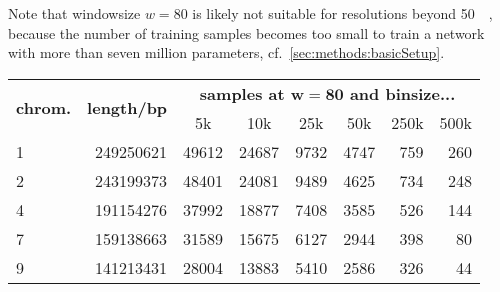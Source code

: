 Note that windowsize $w=80$ is likely not suitable for resolutions beyond \SI{50}{\kilo\bp}, because the number of training samples becomes too small
to train a network with more than seven million parameters, cf.~\cref{sec:methods:basicSetup}.
\begin{table}[hbp]
\centering
\begin{tabular}{lrrrrrrr}
\hline
\multicolumn{1}{c}{\multirow{2}{*}{\textbf{chrom.}}} & \multicolumn{1}{c}{\multirow{2}{*}{\textbf{length/bp}}} & \multicolumn{6}{c}{\textbf{samples at $\mathbf{w=80}$ and binsize...}}                                                                                                \\
\multicolumn{1}{c}{}                                     & \multicolumn{1}{c}{}                                    & \multicolumn{1}{c}{5k} & \multicolumn{1}{c}{10k} & \multicolumn{1}{c}{25k} & \multicolumn{1}{c}{50k} & \multicolumn{1}{c}{250k} & \multicolumn{1}{c}{500k} \\ \hline
1                                                        & 249250621                                               & 49612                  & 24687                   & 9732                    & 4747                    & 759                      & 260                      \\
2                                                        & 243199373                                               & 48401                  & 24081                   & 9489                    & 4625                    & 734                      & 248                      \\
4                                                        & 191154276                                               & 37992                  & 18877                   & 7408                    & 3585                    & 526                      & 144                      \\
7                                                        & 159138663                                               & 31589                  & 15675                   & 6127                    & 2944                    & 398                      & 80                       \\
9                                                        & 141213431                                               & 28004                  & 13883                   & 5410                    & 2586                    & 326                      & 44                       \\

\end{tabular}
\end{table}

